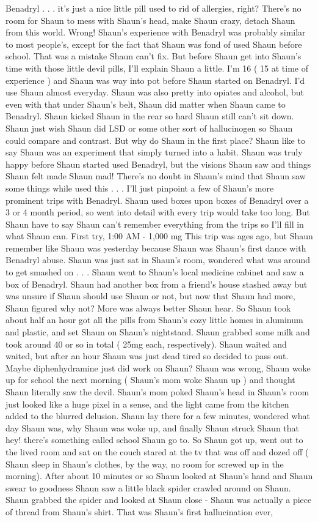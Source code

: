 \documentclass[12pt]{book}
\begin{document}
Benadryl . . .  it's just a nice little pill used to rid of allergies, right? There's no room for Shaun to mess with Shaun's head, make Shaun crazy, detach Shaun from this world. Wrong! Shaun's experience with Benadryl was probably similar to most people's, except for the fact that Shaun was fond of used Shaun before school. That was a mistake Shaun can't fix. But before Shaun get into Shaun's time with those little devil pills, I'll explain Shaun a little. I'm 16 ( 15 at time of experience ) and Shaun was way into pot before Shaun started on Benadryl. I'd use Shaun almost everyday. Shaun was also pretty into opiates and alcohol, but even with that under Shaun's belt, Shaun did matter when Shaun came to Benadryl. Shaun kicked Shaun in the rear so hard Shaun still can't sit down. Shaun just wish Shaun did LSD or some other sort of hallucinogen so Shaun could compare and contrast. But why do Shaun in the first place? Shaun like to say Shaun was an experiment that simply turned into a habit. Shaun was truly happy before Shaun started used Benadryl, but the visions Shaun saw and things Shaun felt made Shaun mad! There's no doubt in Shaun's mind that Shaun saw some things while used this . . .  I'll just pinpoint a few of Shaun's more prominent trips with Benadryl. Shaun used boxes upon boxes of Benadryl over a 3 or 4 month period, so went into detail with every trip would take too long. But Shaun have to say Shaun can't remember everything from the trips so I'll fill in what Shaun can. First try, 1:00 AM - 1,000 mg This trip was ages ago, but Shaun remember like Shaun was yesterday because Shaun was Shaun's first dance with Benadryl abuse. Shaun was just sat in Shaun's room, wondered what was around to get smashed on . . .  Shaun went to Shaun's local medicine cabinet and saw a box of Benadryl. Shaun had another box from a friend's house stashed away but was unsure if Shaun should use Shaun or not, but now that Shaun had more, Shaun figured why not? More was always better Shaun hear. So Shaun took about half an hour got all the pills from Shaun's cozy little homes in aluminum and plastic, and set Shaun on Shaun's nightstand. Shaun grabbed some milk and took around 40 or so in total ( 25mg each, respectively). Shaun waited and waited, but after an hour Shaun was just dead tired so decided to pass out. Maybe diphenhydramine just did work on Shaun? Shaun was wrong, Shaun woke up for school the next morning ( Shaun's mom woke Shaun up ) and thought Shaun literally saw the devil. Shaun's mom poked Shaun's head in Shaun's room just looked like a huge pixel in a sense, and the light came from the kitchen added to the blurred delusion. Shaun lay there for a few minutes, wondered what day Shaun was, why Shaun was woke up, and finally Shaun struck Shaun that hey! there's something called school Shaun go to. So Shaun got up, went out to the lived room and sat on the couch stared at the tv that was off and dozed off ( Shaun sleep in Shaun's clothes, by the way, no room for screwed up in the morning). After about 10 minutes or so Shaun looked at Shaun's hand and Shaun swear to goodness Shaun saw a little black spider crawled around on Shaun. Shaun grabbed the spider and looked at Shaun close - Shaun was actually a piece of thread from Shaun's shirt. That was Shaun's first hallucination ever, 
\end{document}
